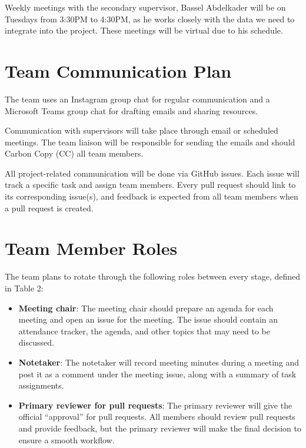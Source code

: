 \documentclass{article}
\begin{document}
\noindent Weekly meetings with the secondary supervisor, Bassel Abdelkader will be on Tuesdays from 3:30PM to 4:30PM, as he works closely with the data 
we need to integrate into the project. These meetings will be virtual due
to his schedule.

\section{Team Communication Plan}

The team uses an Instagram group chat for regular communication and a Microsoft Teams group chat for drafting emails and sharing resources.\newline

\noindent Communication with supervisors will take place through email or scheduled meetings.
The team liaison will be responsible for sending the emails and should Carbon Copy (CC) all team members.\newline

\noindent All project-related communication will be done via GitHub issues. Each issue will track a specific task and assign team members. Every pull request should link to its 
corresponding issue(s), and feedback is expected from all team members when a pull request is created.

\section{Team Member Roles}

The team plans to rotate through the following roles between every stage, defined
in Table 2:

\begin{itemize}
  \item \textbf{Meeting chair}: The meeting chair should prepare an agenda for each
  meeting and open an issue for the meeting. The issue should contain an attendance
  tracker, the agenda, and other topics that may need to be discussed.
  \item \textbf{Notetaker}: The notetaker will record meeting minutes during a 
  meeting and post it as a comment under the meeting issue, along with a summary of 
  task assignments.
  \item \textbf{Primary reviewer for pull requests}: The primary reviewer will give
  the official ``approval'' for pull requests. All members should review pull requests
  and provide feedback, but the primary reviewer will make the final decision to
  ensure a smooth workflow.
\end{itemize}
\end{document}
